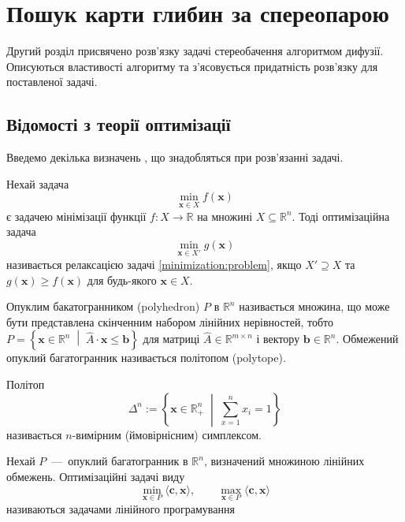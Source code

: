 \chapter{Пошук карти глибин за спереопарою}

Другий розділ присвячено розв'язку задачі стереобачення алгоритмом дифузії.
Описуються властивості алгоритму та з'ясовується придатність
розв'язку для поставленої задачі.

\section{Відомості з теорії оптимізації}
Введемо декілька визначень \cite{overview:savchynskyy:diffusion},
що знадобляться при розв'язанні задачі.

Нехай задача
\begin{equation} \label{minimization:problem}
    \min_{\pmb{x} \in X} f \left( \pmb{x} \right)
\end{equation}
є задачею мінімізації функції $f: X \to \mathbb{R}$ на множині
$X \subseteq \mathbb{R}^n$.
Тоді оптимізаційна задача
\begin{equation*}
    \min_{\pmb{x} \in X'} g \left(\pmb{x} \right)
\end{equation*}
називається релаксацією задачі \eqref{minimization:problem},
якщо $X' \supseteq X$ та $g \left( \pmb{x} \right) \ge f \left( \pmb{x} \right)$
для будь-якого $\pmb{x} \in X$.

Опуклим бакатогранником (polyhedron) $P$ в $\mathbb{R}^n$ називається множина,
що може бути представлена скінченним набором лінійних нерівностей,
тобто
$P = \left\{
    \pmb{x} \in \mathbb{R}^n \; \middle| \;
    \hat{A} \cdot \pmb{x} \le \pmb{b}
\right\}$
для матриці $\hat{A} \in \mathbb{R}^{m \times n}$ і вектору
$\pmb{b} \in \mathbb{R}^n$.
Обмежений опуклий багатогранник називається політопом (polytope).

Політоп
\begin{equation*}
    \Delta^n := \left\{
        \pmb{x} \in \mathbb{R}^n_+ \; \middle| \; \sum \limits_{x = 1}^n x_i = 1
    \right\}
\end{equation*}
називається $n$-вимірним (ймовірнісним) симплексом.

Нехай $P$~---~опуклий багатогранник в $\mathbb{R}^n$,
визначений множиною лінійних обмежень.
Оптимізаційні задачі виду
\begin{equation*}
    \min \limits_{\pmb{x} \in P} \langle \pmb{c}, \pmb{x} \rangle, \qquad
    \max \limits_{\pmb{x} \in P} \langle \pmb{c}, \pmb{x} \rangle
\end{equation*}
називаються задачами лінійного програмування

